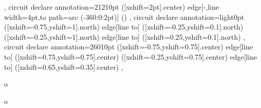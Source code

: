 {{  },
 circuit declare annotation={2121}{0pt} %
  {
   ([xshift=2pt]\tikzlastnode.center) edge[-,line width=4pt,to path={arc (-360:0:2pt)}] ()
  },
 circuit declare annotation={light}{0pt} %
  {
   ([xshift=-0.75\tikzcircuitssizeunit,yshift=1\tikzcircuitssizeunit]\tikzlastnode.north) edge[line to] ([xshift=-0.25\tikzcircuitssizeunit,yshift=0.1\tikzcircuitssizeunit]\tikzlastnode.north)
   ([xshift=-0.25\tikzcircuitssizeunit,yshift=1\tikzcircuitssizeunit]\tikzlastnode.north) edge[line to] ([xshift=0.25\tikzcircuitssizeunit,yshift=0.1\tikzcircuitssizeunit]\tikzlastnode.north)
  },
 circuit declare annotation={2601}{0pt} %
  {
   ([xshift=-0.75\tikzcircuitssizeunit,yshift=0.75\tikzcircuitssizeunit]\tikzlastnode.center) edge[line to] ([xshift=0.75\tikzcircuitssizeunit,yshift=0.75\tikzcircuitssizeunit]\tikzlastnode.center)
   ([xshift=-0.25\tikzcircuitssizeunit,yshift=0.75\tikzcircuitssizeunit]\tikzlastnode.center) edge[line to] ([xshift=0.65\tikzcircuitssizeunit,yshift=0.35\tikzcircuitssizeunit]\tikzlastnode.center)
  },
}

\makeatletter
\newcommand\currentcoordinate{\the\tikz@lastxsaved,\the\tikz@lastysaved}

\newcommand{\crossings}[2]{
 \fill [name intersections={of=#1 and #2, name=i, total=\t}]
 \foreach \s in {1,...,\t}{(i-\s) node[crossing] {}};
}


 { o }
{
 \begin{scope}[\fscolor, line width=\fslinewidth, \fslinetype]
  }
  {
 \end{scope}
}


 { o }
{
 \begin{scope}[\cscolor, line width=\cslinewidth, \cslinetype]
  }
  {
 \end{scope}
}

